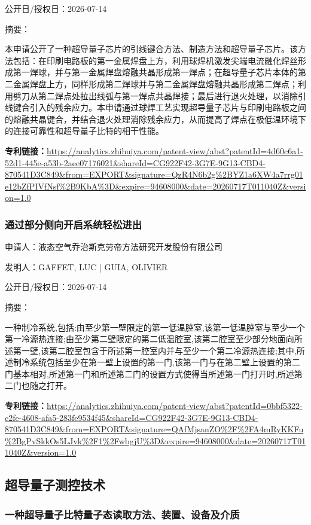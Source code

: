 \documentclass[12pt,a4paper]{ctexart}
\begin{document}
公开日/授权日：2026-07-14

摘要：

本申请公开了一种超导量子芯片的引线键合方法、制造方法和超导量子芯片。该方法包括：在印刷电路板的第一金属焊盘上方，利用球焊机激发尖端电流融化焊丝形成第一焊球，并与第一金属焊盘熔融共晶形成第一焊点；在超导量子芯片本体的第二金属焊盘上方，同样形成第二焊球并与第二金属焊盘熔融共晶形成第二焊点；利用劈刀从第二焊点处拉出线弧与第一焊点共晶焊接；最后进行退火处理，以消除引线键合引入的残余应力。本申请通过球焊工艺实现超导量子芯片与印刷电路板之间的熔融共晶键合，并结合退火处理消除残余应力，从而提高了焊点在极低温环境下的连接可靠性和超导量子比特的相干性能。

\noindent\textbf{专利链接：}\url{https://analytics.zhihuiya.com/patent-view/abst?patentId=4d60c6a1-52d1-445e-a53b-2aee07176021&shareId=CG922F42-3G7E-9G13-CBD4-870541D3C849&from=EXPORT&signature=QzR4N6b2g%2BYZ1a6XW4a7rrg01e12bZfPIVfNsf%2B9KbA%3D&expire=94608000&date=20260717T011040Z&version=1.0}

\subsubsection{ 通过部分侧向开启系统轻松进出 }

申请人：液态空气乔治斯克劳帝方法研究开发股份有限公司

发明人：GAFFET, LUC | GUIA, OLIVIER

公开日/授权日：2026-07-14

摘要：

一种制冷系统,包括:由至少第一壁限定的第一低温腔室,该第一低温腔室与至少一个第一冷源热连接;由至少第二壁限定的第二低温腔室,该第二腔室至少部分地面向所述第一壁,该第二腔室包含于所述第一腔室内并与至少一个第二冷源热连接;其中,所述制冷系统包括至少在第一壁上设置的第一门,该第一门与在第二壁上设置的第二门基本相对,所述第一门和所述第二门的设置方式使得当所述第一门打开时,所述第二门也随之打开。

\noindent\textbf{专利链接：}\url{https://analytics.zhihuiya.com/patent-view/abst?patentId=0bbf5322-c2fe-4608-afa5-283fe9534f45&shareId=CG922F42-3G7E-9G13-CBD4-870541D3C849&from=EXPORT&signature=QAfMjsanZO%2F%2FA4mRyKKFu%2BgPvSkkOs5LJvk%2F1%2FwbgjU%3D&expire=94608000&date=20260717T011040Z&version=1.0}


\subsection{ 超导量子测控技术 }

\subsubsection{ 一种超导量子比特量子态读取方法、装置、设备及介质 }
\end{document}
